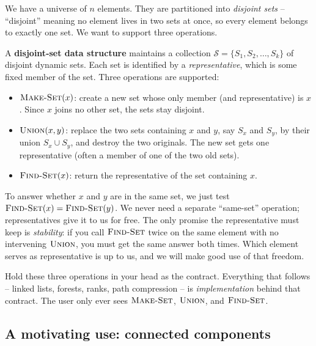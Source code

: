 We have a universe of $n$ elements. They are
partitioned into \emph{disjoint sets} -- ``disjoint'' meaning no element lives
in two sets at once, so every element belongs to exactly one set. We want to
support three operations.

\begin{formalbox}
A \textbf{disjoint-set data structure} maintains a collection
$\mathcal{S} = \{S_1, S_2, \dots, S_k\}$ of disjoint dynamic sets. Each set is
identified by a \emph{representative}, which is some fixed member of the set.
Three operations are supported:
\begin{itemize}
  \item $\textsc{Make-Set}(x)$: create a new set whose only member (and
        representative) is $x$. Since $x$ joins no other set, the sets stay
        disjoint.
  \item $\textsc{Union}(x, y)$: replace the two sets containing $x$ and $y$,
        say $S_x$ and $S_y$, by their union $S_x \cup S_y$, and destroy the two
        originals. The new set gets one representative (often a member of one
        of the two old sets).
  \item $\textsc{Find-Set}(x)$: return the representative of the set
        containing $x$.
\end{itemize}
\end{formalbox}

To answer whether $x$ and $y$ are in the same set, we just test
$\textsc{Find-Set}(x) = \textsc{Find-Set}(y)$. We never need a separate
``same-set'' operation; representatives give it to us for free. The only
promise the representative must keep is \emph{stability}: if you call
$\textsc{Find-Set}$ twice on the same element with no intervening
$\textsc{Union}$, you must get the same answer both times. Which element
serves as representative is up to us, and we will make good use of that
freedom.

\begin{focusbox}
Hold these three operations in your head as the contract. Everything that
follows -- linked lists, forests, ranks, path compression -- is
\emph{implementation} behind that contract. The user only ever sees
$\textsc{Make-Set}$, $\textsc{Union}$, and $\textsc{Find-Set}$.
\end{focusbox}

\subsection{A motivating use: connected components}
\label{ch19:components}


